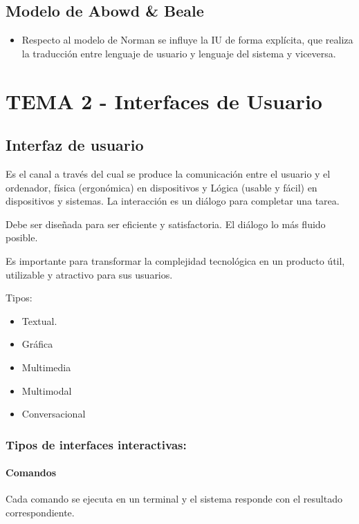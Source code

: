 \documentclass[12pt, twoside, openright]{report} %
\begin{document}
\section{Modelo de Abowd \& Beale}

\begin{itemize}
	\item Respecto al modelo de Norman se influye la IU de forma explícita,
	      que realiza la traducción entre lenguaje de usuario y lenguaje del
	      sistema y viceversa.
\end{itemize}

\chapter{TEMA 2 - Interfaces de Usuario}

\section{Interfaz de usuario}

Es el canal a través del cual se produce la comunicación entre el
usuario y el ordenador, física (ergonómica) en dispositivos y Lógica
(usable y fácil) en dispositivos y sistemas. La interacción es un
diálogo para completar una tarea.

Debe ser diseñada para ser eficiente y satisfactoria. El diálogo lo
más fluido posible.

Es importante para transformar la complejidad tecnológica en un
producto útil, utilizable y atractivo para sus usuarios.

Tipos:

\begin{itemize}
	\item Textual.
	\item Gráfica
	\item Multimedia
	\item Multimodal
	\item Conversacional
\end{itemize}

\subsection{Tipos de interfaces interactivas:}

\subsubsection{Comandos}
Cada comando se ejecuta en un terminal y el sistema
responde con el resultado correspondiente.
\end{document}
